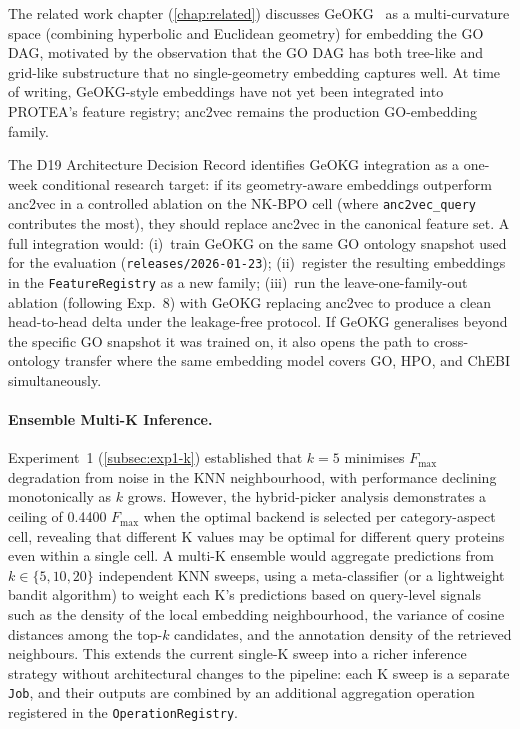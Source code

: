 The related work chapter (\cref{chap:related}) discusses GeOKG~\cite{geokg2025}
as a multi-curvature space (combining hyperbolic and Euclidean geometry) for
embedding the GO DAG, motivated by the observation that the GO DAG has both
tree-like and grid-like substructure that no single-geometry embedding captures
well. At time of writing, GeOKG-style embeddings have not yet been integrated
into PROTEA's feature registry; anc2vec remains the production GO-embedding
family.

The D19 Architecture Decision Record identifies GeOKG integration as a one-week
conditional research target: if its geometry-aware embeddings outperform
anc2vec in a controlled ablation on the NK-BPO cell (where
\texttt{anc2vec\_query} contributes the most), they should replace anc2vec in
the canonical feature set. A full integration would: (i)~train GeOKG on the
same GO ontology snapshot used for the evaluation (\texttt{releases/2026-01-23});
(ii)~register the resulting embeddings in the \texttt{FeatureRegistry} as a
new family; (iii)~run the leave-one-family-out ablation (following Exp.~8) with
GeOKG replacing anc2vec to produce a clean head-to-head delta under the
leakage-free
protocol. If GeOKG generalises beyond the specific GO snapshot it was trained
on, it also opens the path to cross-ontology transfer where the same embedding
model covers GO, HPO, and ChEBI simultaneously.

\paragraph{Ensemble Multi-K Inference.}
\label{para:future-multik}

Experiment~1 (\cref{subsec:exp1-k}) established that $k{=}5$ minimises
$F_{\max}$ degradation from noise in the KNN neighbourhood, with performance
declining monotonically as $k$ grows. However, the hybrid-picker analysis
demonstrates a ceiling of 0.4400 $F_{\max}$ when the optimal backend is
selected per category-aspect cell, revealing that different K values may be
optimal for different query proteins even within a single cell. A multi-K
ensemble would aggregate predictions from $k \in \{5, 10, 20\}$ independent
KNN sweeps, using a meta-classifier (or a lightweight bandit algorithm) to
weight each K's predictions based on query-level signals such as the density
of the local embedding neighbourhood, the variance of cosine distances among
the top-$k$ candidates, and the annotation density of the retrieved
neighbours. This extends the current single-K sweep into a richer inference
strategy without architectural changes to the pipeline: each K sweep is a
separate \texttt{Job}, and their outputs are combined by an additional
aggregation operation registered in the \texttt{OperationRegistry}.


